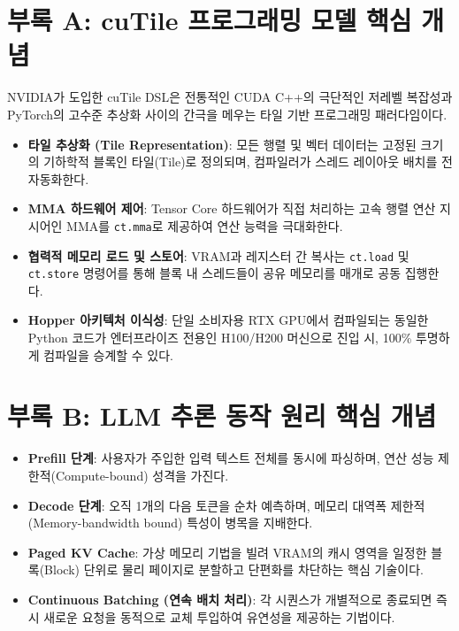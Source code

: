 \documentclass[preprint]{kcc} %
\begin{document}
\newpage
\appendix
\section{부록 A: cuTile 프로그래밍 모델 핵심 개념}
NVIDIA가 도입한 cuTile DSL은 전통적인 CUDA C++의 극단적인 저레벨 복잡성과 PyTorch의 고수준 추상화 사이의 간극을 메우는 타일 기반 프로그래밍 패러다임이다.
\begin{itemize}
    \item \textbf{타일 추상화 (Tile Representation)}: 모든 행렬 및 벡터 데이터는 고정된 크기의 기하학적 블록인 타일(Tile)로 정의되며, 컴파일러가 스레드 레이아웃 배치를 전 자동화한다.
    \item \textbf{MMA 하드웨어 제어}: Tensor Core 하드웨어가 직접 처리하는 고속 행렬 연산 지시어인 MMA를 \texttt{ct.mma}로 제공하여 연산 능력을 극대화한다.
    \item \textbf{협력적 메모리 로드 및 스토어}: VRAM과 레지스터 간 복사는 \texttt{ct.load} 및 \texttt{ct.store} 명령어를 통해 블록 내 스레드들이 공유 메모리를 매개로 공동 집행한다.
    \item \textbf{Hopper 아키텍처 이식성}: 단일 소비자용 RTX GPU에서 컴파일되는 동일한 Python 코드가 엔터프라이즈 전용인 H100/H200 머신으로 진입 시, 100\% 투명하게 컴파일을 승계할 수 있다.
\end{itemize}

\section{부록 B: LLM 추론 동작 원리 핵심 개념}
\begin{itemize}
    \item \textbf{Prefill 단계}: 사용자가 주입한 입력 텍스트 전체를 동시에 파싱하며, 연산 성능 제한적(Compute-bound) 성격을 가진다.
    \item \textbf{Decode 단계}: 오직 1개의 다음 토큰을 순차 예측하며, 메모리 대역폭 제한적(Memory-bandwidth bound) 특성이 병목을 지배한다.
    \item \textbf{Paged KV Cache}: 가상 메모리 기법을 빌려 VRAM의 캐시 영역을 일정한 블록(Block) 단위로 물리 페이지로 분할하고 단편화를 차단하는 핵심 기술이다.
    \item \textbf{Continuous Batching (연속 배치 처리)}: 각 시퀀스가 개별적으로 종료되면 즉시 새로운 요청을 동적으로 교체 투입하여 유연성을 제공하는 기법이다.
\end{itemize}
\end{document}
